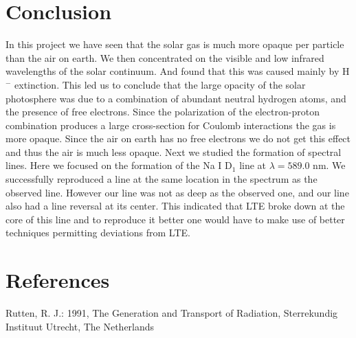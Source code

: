 \documentclass{aa}   %
\begin{document}
\section{Conclusion}
In this project we have seen that the solar gas is much more opaque per particle than the air on earth. We then concentrated on the visible and low infrared wavelengths of the solar continuum. And found that this was caused mainly by H$^-$ extinction. This led us to conclude that the large opacity of the solar photosphere was due to a combination of abundant neutral hydrogen atoms, and the presence of free electrons. Since the polarization of the electron-proton combination produces a large cross-section for Coulomb interactions the gas is more opaque. Since the air on earth has no free electrons we do not get this effect and thus the air is much less opaque.
Next we studied the formation of spectral lines. Here we focused on the formation of the Na I D$_1$ line at $\lambda = 589.0$ nm. We successfully reproduced a line at the same location in the spectrum as the observed line. However our line was not as deep as the observed one, and our line also had a line reversal at its center. This indicated that LTE broke down at the core of this line and to reproduce it better one would have to make use of better techniques permitting deviations from LTE.

\section{References}
Rutten, R. J.: 1991, The Generation and Transport of Radiation, Sterrekundig Instituut Utrecht, The Netherlands

\end{document}
